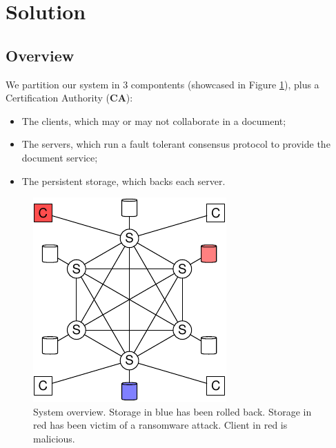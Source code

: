\section{Solution}

\subsection{Overview}

We partition our system in 3 compontents (showcased in
Figure \ref{fig:overview}), plus a Certification Authority (\textbf{CA}):
\begin{itemize}
    \setlength{\itemsep}{0pt}
    \setlength{\parskip}{0pt}
    \setlength{\parsep}{0pt}
    \item The clients, which may or may not collaborate in a
        document;
    \item The servers, which run a fault tolerant consensus
        protocol to provide the document service;
    \item The persistent storage, which backs each server.
\end{itemize}

\begin{figure}[ht]
    \centering
    \includegraphics[width=.5\linewidth]{img/sys-1}
    \caption{System overview. Storage in blue has been rolled
    back. Storage in red has been victim of a ransomware attack.
    Client in red is malicious.}
    \label{fig:overview}
\end{figure}

